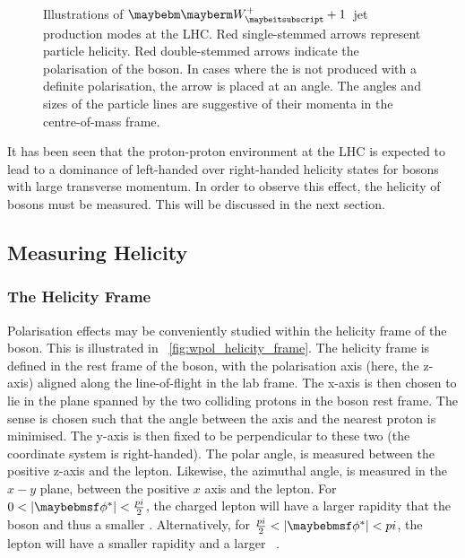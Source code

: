 \begin{figure}
\centering
{}\quad
{}\quad
{}\\
\quad
{}\quad
{}
\caption[Illustrations of $\PWplus+1$~jet production modes at the
\acs{LHC}]{Illustrations of $\PWplus+1$~jet production modes at the LHC. Red
  single-stemmed arrows represent particle helicity. Red double-stemmed arrows
  indicate the polarisation of the \PW boson. In cases where the \PW is not
  produced with a definite polarisation, the arrow is placed at an angle. The
  angles and sizes of the particle lines are suggestive of their momenta in the
  centre-of-mass frame.}
\label{fig:w1jet_modes}
\end{figure}

It has been seen that the proton-proton environment at the \ac{LHC} is expected
to lead to a dominance of left-handed over right-handed helicity states for \PW
bosons with large transverse momentum. In order to observe this effect, the
helicity of \PW bosons must be measured. This will be discussed in the next section.

\subsection{Measuring Helicity}
\label{sec:measuring_helicity}
\subsubsection{The Helicity Frame}
Polarisation effects may be conveniently studied within the helicity
frame of the \PW boson. This is illustrated in
\fig~\ref{fig:wpol_helicity_frame}. The helicity frame is defined in
the rest frame of the \PW boson, with the polarisation axis (here, the
z-axis) aligned along the \PW line-of-flight in the lab frame. The
x-axis is then chosen to lie in the plane spanned by the two colliding
protons in the boson rest frame. The sense is chosen such that the
angle between the axis and the nearest proton is minimised. The y-axis
is then fixed to be perpendicular to these two (the coordinate system
is right-handed). The polar angle, \thetastar is measured between the
positive z-axis and the lepton. Likewise, the azimuthal angle,
\phistar is measured in the $x-y$ plane, between the positive $x$ axis
and the lepton. For $0 < |\phistar| < \frac{\pi}{2}$, the charged
lepton will have a larger rapidity that the \PW boson and thus a
smaller \Pt. Alternatively, for $\frac{\pi}{2} < |\phistar| < \pi$,
the lepton will have a smaller rapidity and a larger \Pt~\cite{wpol_an}.

